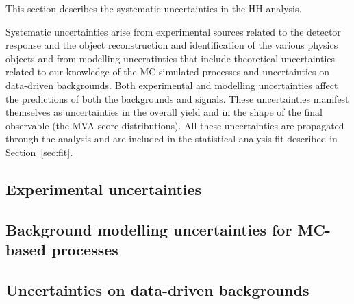 This section describes the systematic uncertainties in the HH analysis.

Systematic uncertainties arise from experimental sources related to the detector response and the object reconstruction and identification of the various physics objects and from modelling unceratinties that include theoretical uncertainties related to our knowledge of the MC simulated processes and uncertainties on data-driven backgrounds. Both experimental and modelling uncertainties affect the predictions of both the backgrounds and signals. These uncertainties manifest themselves as uncertainties in the overall yield and in the shape of the final observable (the MVA score distributions). All these uncertainties are propagated through the analysis and are included in the statistical analysis fit described in Section~\ref{sec:fit}.

\subsection{Experimental uncertainties}
\label{sec:systematics_experimental}





\subsection{Background modelling uncertainties for MC-based processes}
\label{sec:systematics_backgroundmodelling}




\subsection{Uncertainties on data-driven backgrounds}
\label{sec:systematics_datadriven}








